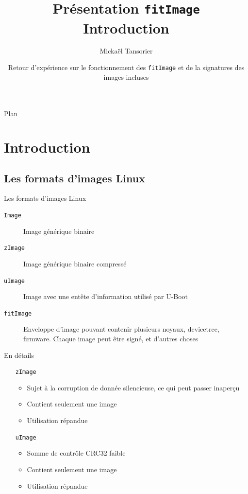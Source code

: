 \documentclass[aspectratio=169]{beamer}
\title[U-Boot]{Présentation \texttt{fitImage} \\ \textbf{Introduction}}
\author[Mickaël Tansorier]{Mickaël Tansorier}
\date[Août 2018]{Retour d'expérience sur le fonctionnement des \texttt{fitImage} et \newline de la signatures des images incluses}
\begin{document}

\begin{frame}
\titlepage
\end{frame}



\begin{frame}{Plan}
\tableofcontents[hideallsubsections]
\end{frame}

\section{Introduction}

\subsection{Les formats d'images Linux}

\begin{frame}
\begin{center}
\huge{Les formats d'images Linux}
\end{center}
\end{frame}

\begin{frame}
\begin{description}
	\item[\texttt{Image}] Image générique binaire
	\item[\texttt{zImage}] Image générique binaire compressé
	\item[\texttt{uImage}] Image avec une entête d'information utilisé par U-Boot
	\item[\texttt{fitImage}] Enveloppe d'image pouvant contenir plusieurs noyaux, devicetree, firmware. Chaque image peut être signé, et d'autres choses
\end{description}
\end{frame}

\begin{frame}{En détails}
\begin{itemize}
	\item [\texttt{zImage}]
	\begin{itemize}
	 	\item Sujet à la corruption de donnée silencieuse, ce qui peut passer inaperçu
	 	\item Contient seulement une image
	 	\item Utilisation répandue
	\end{itemize}
	\item [\texttt{uImage}]
	\begin{itemize}
		\item Somme de contrôle CRC32 faible
	 	\item Contient seulement une image
	 	\item Utilisation répandue
	\end{itemize}
\end{itemize}
\end{frame}
\end{document}
